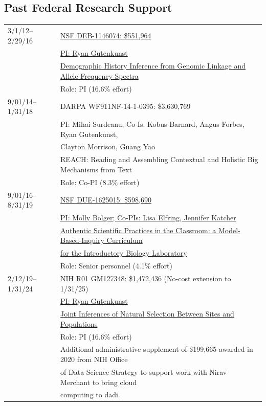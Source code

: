 \documentclass[11pt]{article}
\begin{document}
\subsection*{Past Federal Research Support}
\begin{longtable}[l]{l l}
3/1/12--2/29/16 & \href{http://www.nsf.gov/awardsearch/showAward?AWD_ID=1146074}{NSF DEB-1146074: \$551,964}\\
                  & \href{http://www.nsf.gov/awardsearch/showAward?AWD_ID=1146074}{PI: Ryan Gutenkunst}\\
                  & \href{http://www.nsf.gov/awardsearch/showAward?AWD_ID=1146074}{Demographic History Inference from Genomic Linkage and Allele Frequency Spectra}\\
                  & Role: PI (16.6\% effort)\\
9/01/14--1/31/18 & DARPA WF911NF-14-1-0395: \$3,630,769\\
                  & PI: Mihai Surdeanu; Co-Is: Kobus Barnard, Angus Forbes, Ryan Gutenkunst,\\
                  & Clayton Morrison, Guang Yao\\
                  & REACH: Reading and Assembling Contextual and Holistic Big Mechanisms from Text\\
                  & Role: Co-PI (8.3\% effort)\\
9/01/16--8/31/19 & \href{https://www.nsf.gov/awardsearch/showAward?AWD_ID=1625015}{NSF DUE-1625015: \$598,690}\\
                  & \href{https://www.nsf.gov/awardsearch/showAward?AWD_ID=1625015}{PI: Molly Bolger; Co-PIs: Lisa Elfring, Jennifer Katcher}\\
                  &  \href{https://www.nsf.gov/awardsearch/showAward?AWD_ID=1625015}{Authentic Scientific Practices in the Classroom: a Model-Based-Inquiry Curriculum}\\
                  &\href{https://www.nsf.gov/awardsearch/showAward?AWD_ID=1625015}{for the Introductory Biology Laboratory}\\
                  & Role: Senior personnel (4.1\% effort)\\
2/12/19--1/31/24 & \href{https://reporter.nih.gov/project-details/9659095}{NIH R01 GM127348: \$1,472,436} (No-cost extension to 1/31/25)\\
                  & \href{https://reporter.nih.gov/project-details/9659095}{PI: Ryan Gutenkunst}\\
                  &  \href{https://reporter.nih.gov/project-details/9659095}{Joint Inferences of Natural Selection Between Sites and Populations}\\
                  & Role: PI (16.6\% effort)\\
                  & Additional administrative supplement of \$199,665 awarded in 2020  from NIH Office\\
                  & \qquad of Data Science Strategy to support work with Nirav Merchant to bring cloud\\
                  & \qquad computing to dadi.\\
\end{longtable}
\end{document}
